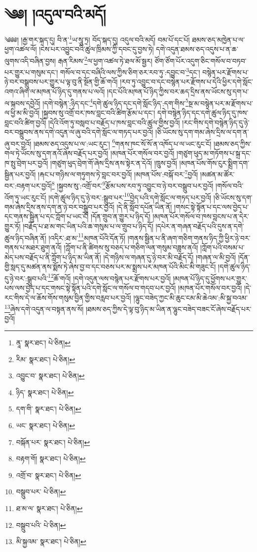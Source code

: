 \setcounter{footnote}{0} 
\chapter{༄༅། །འདུལ་བའི་མདོ།}༄༅༅། །རྒྱ་གར་སྐད་དུ། བི་ན་\footnote{ནཱ་  སྣར་ཐང་།  པེ་ཅིན། }ཡ་སཱུ་ཏྲ། བོད་སྐད་དུ། འདུལ་བའི་མདོ། བམ་པོ་དང་པོ། ཐམས་ཅད་མཁྱེན་པ་ལ་ཕྱག་འཚལ་ལོ། །ངེས་པར་འབྱུང་བའི་ཚུལ་ཁྲིམས་ཀྱི་དབང་དུ་བྱས་ཏེ། དགེ་འདུན་ཐམས་ཅད་འདུས་པ་ན་ཆ་ལུགས་འདི་བཞིན་བྱས། རྒན་རིམས་\footnote{རིམ་  སྣར་ཐང་།  པེ་ཅིན། }ལ་ཕྱག་འཚལ་ཏེ་ཐལ་མོ་སྦྱར། ཙོག་ཙོག་པོར་འདུག་ཅིང་གསོལ་བ་བཏབ་པར་གྱུར་པ་གསུམ་དང་། གསོལ་བ་དང་བཞིའི་ལས་ཀྱིས་ཅིག་ཅར་རབ་ཏུ་:དབྱུང་བ་\footnote{འབྱུང་བ་  སྣར་ཐང་།  པེ་ཅིན། }དང་། བསྙེན་པར་རྫོགས་པ་ཉེ་བར་བསྒྲུབས་པར་གྱུར་པ་ལྟ་བུ་ནི་སྔོན་གྱི་ཆོ་གའོ། །རབ་ཏུ་འབྱུང་བ་དང་བསྙེན་པར་རྫོགས་པ་དེའི་ཕྱིར་དགེ་སློང་འགའ་ཞིག་ལ་མཁན་པོ་ཉིད་དུ་གནས་པ་ལའོ། །དང་པོའི་མཁན་པོ་ཉིད་ཀྱིས་བར་ཆད་དྲིས་ནས་ཡོངས་སུ་དག་པ་ལ་སྐབས་དབྱེའོ། །དགེ་བསྙེན་:ཉིད་དང་\footnote{ཉིད་  སྣར་ཐང་།  པེ་ཅིན། }དགེ་ཚུལ་ཉིད་དང་དགེ་སློང་ཉིད་:དག་གིས་\footnote{དག་གི་  སྣར་ཐང་།  པེ་ཅིན། }སྔ་མ་བསྙེན་པར་མ་རྫོགས་པ་ལ་ཕྱི་མ་མི་བྱའོ། །སྐྱབས་སུ་འགྲོ་བར་ཁས་བླང་བའི་ཚིག་རྩོམ་པ་དང་། དགེ་བསྙེན་ཉིད་དང་དགེ་ཚུལ་ཉིད་དུ་ཁས་བླང་བའི་ཚིག་བྱའོ། །དེའི་འོག་ཏུ་བསླབ་པ་བརྗོད་པ་ཁས་བླང་བའི་ཚུལ་གྱིས་བྱའོ། །རང་གིས་དགེ་བསྙེན་ཉིད་དུ་ཉེ་བར་བསྒྲུབས་ནས་དགེ་འདུན་ལ་ཞུ་བའི་དགེ་སློང་ལ་གཏད་པར་བྱའོ། །ཅི་ཡོངས་སུ་དག་གམ་ཞེས་དྲིས་ལ་དག་ན་ཞུ་བར་བྱའོ། །ཐམས་ཅད་འདུས་པ་ལ་:ཡང་རུང་། \footnote{ཡང་  སྣར་ཐང་།  པེ་ཅིན། }གནས་ཁང་སོ་སོ་ན་འཁོད་པ་ལ་ཡང་རུང་ངོ། །ཐམས་ཅད་ཀྱིས་གལ་ཏེ་ཡོངས་སུ་དག་ནའོ་ཞེས་བརྗོད་པར་བྱའོ། །མཁན་པོར་གསོལ་བར་བྱའོ། །གཙུག་ཕུད་མ་གཏོགས་པ་སྐྲ་དང་ཁ་སྤུ་བྲེག་པར་བྱའོ། །གཙུག་ཕུད་བྲེག་གོ་ཞེས་དྲིས་ནས་སྟེར་ན་དེའོ། །ཁྲུས་བྱའོ། །མཁན་པོས་གོས་ངུར་སྨྲིག་དག་སྦྱིན་པར་བྱའོ། །རྐང་པ་གཉིས་ལ་གཏུགས་ཏེ་བླང་བར་བྱའོ། །མཁན་པོས་:བསྐོ་བར་\footnote{བསྐོན་པར་  སྣར་ཐང་།  པེ་ཅིན། }བྱའོ། །མཚན་མ་ཚོར་བར་:བརྟག་པར་བྱའོ།\footnote{བརྟག་གོ།  སྣར་ཐང་།  པེ་ཅིན། } །སྐྱབས་སུ་:འགྲོ་བར་\footnote{འགྲོ་བ་  སྣར་ཐང་།  པེ་ཅིན། }རྩོམ་པས་རབ་ཏུ་འབྱུང་བ་ཉེ་བར་བསྒྲུབ་པར་བྱའོ། །གསོལ་བའི་འོག་ཏུ་ཡང་རུང་ངོ། །དགེ་ཚུལ་ཉིད་དུ་ཉེ་བར་:སྒྲུབ་པར་\footnote{བསྒྲུབ་པར་  པེ་ཅིན། }བྱེད་པའི་དགེ་སློང་ལ་གཏད་པར་བྱའོ། །ཅི་ཡོངས་སུ་དག་གམ་ཞེས་དྲིས་ནས་དག་ན་ཉེ་བར་བསྒྲུབ་པར་བྱའོ། །དེ་ནི་སློབ་དཔོན་ཡིན་ནོ། །གསང་སྟེ་སྟོན་པ་དང་ལས་བྱེད་པ་དང་གནས་སྦྱིན་པ་དང་ཀློག་པ་ཡང་ངོ། །དོན་གྲུབ་ན་གྱུར་པ་ཉིད་དོ། །མཁན་པོར་གསོལ་བ་ཁས་བླངས་པ་ན་དེར་གྱུར་ཏོ། །བརྗོད་པ་ཐ་མ་གང་ཡིན་པའི་ཆ་གསུམ་པ་ལ་གྲུབ་པ་ཉིད་དོ། །དཔེར་ན་གཞན་བརྗོད་པའི་དུས་ན་དགེ་ཚུལ་ཉིད་བཞིན་ནོ། །འདིར་:ཐ་མ་\footnote{ཐ་མ་ལ་  སྣར་ཐང་།  པེ་ཅིན། }མཁན་པོའི་དོན་ཏོ། །གནས་སྦྱིན་པ་ནི་ཞག་གཅིག་གནས་ཉིད་ཀྱི་ཕྱིར་ཉེ་བར་གནས་པ་མཐར་ཐུག་ནའོ། །ཀློག་པ་ནི་ཚིགས་སུ་བཅད་པ་གཅིག་ལན་གསུམ་བཟླས་ནའོ། །ཀློག་པའི་བསམ་པ་མེད་པས་བརྗོད་པ་ནི་ཀློག་པ་ཉིད་མ་ཡིན་ནོ། །དེ་གཉིས་ལ་གཞན་དུ་ཉེ་བར་མི་བརྗོད་དོ། །གཞན་ལ་མི་བྱའོ། །དོན་གྱི་སླད་དུ་མཚན་ནས་སྨོས་ཏེ་ཞེས་བྱ་བ་དང་བཅས་པར་མ་སྨྲས་པར་མཁན་པོའི་མིང་མི་གཟུང་ངོ། །དགེ་ཚུལ་ཉིད་དུ་ཉེ་བར་:སྒྲུབ་པའི་\footnote{བསྒྲུབ་པའི་  པེ་ཅིན། }ཆོ་གའོ། །དགེ་འདུན་ལས་བསྙེན་པར་རྫོགས་པར་བྱའོ། །མཁན་པོ་ཉིད་དུ་ཕྱོགས་པར་གྱུར་པས་ལས་བྱེད་པ་དང་གསང་སྟེ་སྟོན་པའི་དགེ་སློང་ལ་གསོལ་བ་གདབ་པར་བྱའོ། །མཁན་པོར་གསོལ་བར་བྱའོ། །དེ་རང་གིས་དེ་ལ་ཆོས་གོས་གསུམ་བྱིན་གྱིས་བརླབ་པར་བྱའོ། །ལྷུང་བཟེད་ཀྱང་མི་ཆུང་ངམ་མི་ཆེའམ་:མི་སྐྱ་བའམ་\footnote{མི་སྐྱའམ་  སྣར་ཐང་།  པེ་ཅིན། }ཞེས་དགེ་འདུན་ལ་བསྟན་ནས་སོ། །ཐམས་ཅད་ཀྱིས་དེ་ལྟ་བུ་ཉིད་མ་ཡིན་ན་ལྷུང་བཟེད་བཟང་ངོ་ཞེས་བརྗོད་པར་བྱའོ། 